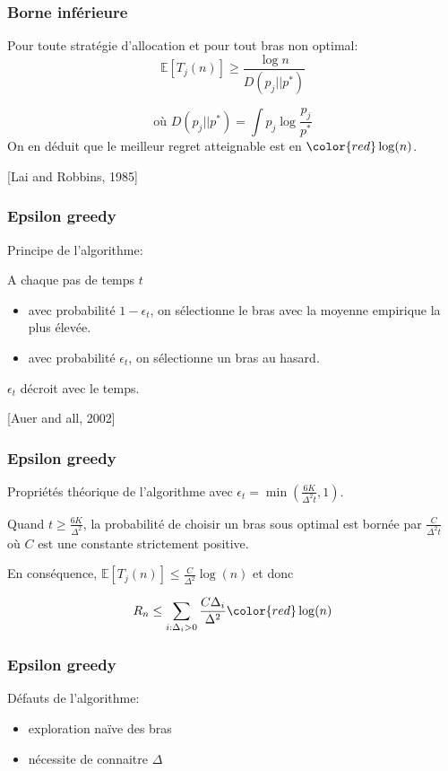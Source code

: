 \documentclass{beamer}
\begin{document}
\begin{frame}
    \frametitle{Borne inférieure}


    Pour toute stratégie d'allocation et pour tout bras non optimal:
    $$\mathbb{E} [T_j(n)] \ge \frac{\log n}{D(p_j || p^*)}$$

    $$\mbox{où }D(p_j || p^*) = \int p_j \log \frac{p_j}{p^*}$$
    On en déduit que le meilleur regret atteignable est en ${\color{red} \log(n)}$.

    \hfill [Lai and Robbins, 1985]

\end{frame}


\begin{frame}
    \frametitle{Epsilon greedy}
    Principe de l'algorithme:

    A chaque pas de temps $t$
    \begin{itemize}
        \item avec probabilité {\color{red}$1 - \epsilon_t$}, on sélectionne le bras avec la moyenne empirique la plus élevée.
        \item avec probabilité {\color{green}$\epsilon_t$}, on sélectionne un bras au hasard.
    \end{itemize}
    $\epsilon_t$ décroit avec le temps.

    \hfill [Auer and all, 2002]
\end{frame}

\begin{frame}
    \frametitle{Epsilon greedy}
    Propriétés théorique de l'algorithme avec {\color{blue} $\epsilon_t = \min(\frac{6K}{\Delta^2t},1)$}.

    Quand $t \ge \frac{6K}{\Delta^2}$, la probabilité de choisir un bras sous optimal est bornée par $\frac{C}{\Delta^2t}$ où $C$ est une constante strictement positive.

    En conséquence, $\mathbb{E} [T_j(n)] \le \frac{C}{\Delta^2}\log(n)$ et donc 

    $$ R_n \le \sum_{i:\Delta_i>0} \frac{C\Delta_i}{\Delta^2}{\color{red} \log(n)} $$

\end{frame}

\begin{frame}
    \frametitle{Epsilon greedy}
    Défauts de l'algorithme:
    \begin{itemize}
        \item exploration naïve des bras
        \item nécessite de connaitre $\Delta$
    \end{itemize}
\end{frame}
\end{document}
